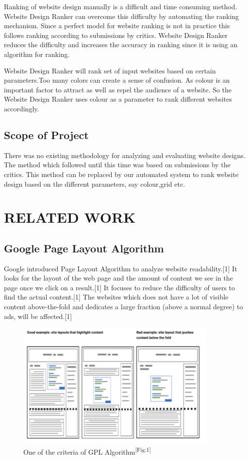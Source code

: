 \documentclass{fisatproject}
\begin{document}
Ranking of website design manually is a difficult and time consuming method. Website Design Ranker can overcome this difficulty by automating the ranking mechanism. Since a perfect model for website ranking is not in practice this follows ranking according to submissions by critics. Website Design Ranker reduces the difficulty and increases the accuracy in ranking since it is using an algorithm for ranking.

Website Design Ranker will rank set of input websites based
on certain parameters.Too many colors can create a sense of confusion. As colour is an important factor to attract as well as repel the audience of a website. So the Website Design Ranker uses colour as a parameter to rank different websites accordingly.
\section{Scope of Project}
There was no existing methodology for analyzing and evaluating website designs. The method which followed until this time was based on submissions by the critics. This method can be replaced by our automated system to rank website design based on the different parameters, say colour,grid etc.
\chapter{RELATED WORK}
\section{Google Page Layout Algorithm}
Google introduced Page Layout Algorithm to analyze website
readability.[1] It looks for the layout of the web page and the amount of
content we see in the page once we click on a result.[1] It focuses to reduce the difficulty of users to find the actual
content.[1]
The websites which does not have a lot of visible content
above-the-fold and dedicates a large fraction (above a normal
degree) to ads, will be affected.[1]


\begin{figure}

	\includegraphics[width=10cm]{image/gpa.png}
	\caption{One of the criteria of GPL Algorithm\textsuperscript{[Fig:1]}}
	\label{fig1:gpa}

\end{figure}
\end{document}
